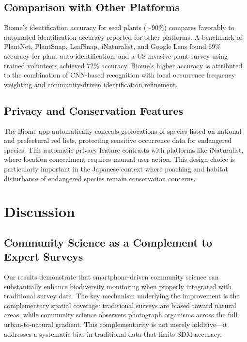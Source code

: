 \documentclass[11pt]{article}
\begin{document}
\subsection{Comparison with Other Platforms}

Biome's identification accuracy for seed plants ($\sim$90\%) compares favorably to automated identification accuracy reported for other platforms. A benchmark of PlantNet, PlantSnap, LeafSnap, iNaturalist, and Google Lens found 69\% accuracy for plant auto-identification, and a US invasive plant survey using trained volunteers achieved 72\% accuracy. Biome's higher accuracy is attributed to the combination of CNN-based recognition with local occurrence frequency weighting and community-driven identification refinement.

\subsection{Privacy and Conservation Features}

The Biome app automatically conceals geolocations of species listed on national and prefectural red lists, protecting sensitive occurrence data for endangered species. This automatic privacy feature contrasts with platforms like iNaturalist, where location concealment requires manual user action. This design choice is particularly important in the Japanese context where poaching and habitat disturbance of endangered species remain conservation concerns.

\section{Discussion}

\subsection{Community Science as a Complement to Expert Surveys}

Our results demonstrate that smartphone-driven community science can substantially enhance biodiversity monitoring when properly integrated with traditional survey data. The key mechanism underlying the improvement is the complementary spatial coverage: traditional surveys are biased toward natural areas, while community science observers photograph organisms across the full urban-to-natural gradient. This complementarity is not merely additive---it addresses a systematic bias in traditional data that limits SDM accuracy.
\end{document}
